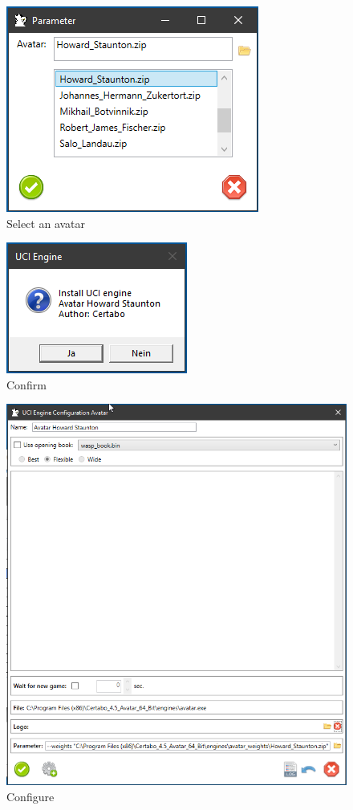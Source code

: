 \documentclass[11pt,a4paper]{article}
\begin{document}
	\begin{figure}[H]
		\centering
		\includegraphics[scale=0.9]{avatar1.png}
		\caption{Select an avatar}
		\label{fig:Avatar1}
	\end{figure}
	
	\begin{figure}[H]
		\centering
		\includegraphics[scale=0.9]{avatar2.png}
		\caption{Confirm}
		\label{fig:Avatar2}
	\end{figure}
	
	\begin{figure}[H]
		\centering
		\includegraphics[scale=0.7]{avatar3.png}
		\caption{Configure}
		\label{fig:Avatar3}
	\end{figure}
	
\end{document}

